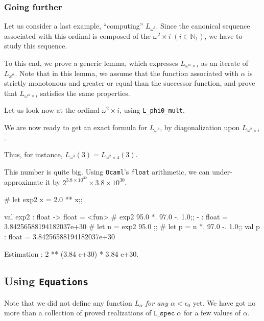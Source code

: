 \subsubsection{Going further}
Let us consider a last example, ``computing'' $L_{\omega^3}$.
Since the canonical sequence associated with this ordinal is composed of the
$\omega^2\times i\;(i\in\mathbb{N}_1)$, we have to study this sequence.

To this end, we prove a generic lemma, which expresses $L_{\omega^\alpha\times i}$ as an iterate of $L_{\omega^\alpha}$. Note that in this lemma, we assume that the function associated with $\alpha$ is strictly monotonous and
greater or equal than the successor function, and prove that $L_{\omega^\alpha\times i}$ satisfies  the same properties.



Let us look now
at the ordinal $\omega^2\times i$, using \texttt{L\_phi0\_mult}.




We are now ready to get an exact formula for $L_{\omega^3}$, by diagonalization upon $L_{\omega^2\times i}$.




Thus, for instance, $L_{\omega^3}(3)=L_{\omega^2\times 4}(3)$.




This number is quite big. Using \texttt{Ocaml}'s \texttt{float} arithmetic,
we can under-approximate it by $2^{3.8\times10^{30}}\times 3.8\times{10^{30}}$.

\begin{Coqsrc}
# let exp2 x = 2.0 ** x;;

val exp2 : float -> float = <fun>
#   exp2 95.0 *. 97.0 -. 1.0;;
- : float = 3.84256588194182037e+30
# let n = exp2 95.0 ;;
# let p = n *. 97.0 -. 1.0;;
val p : float = 3.84256588194182037e+30

Estimation :
2 ** (3.84 e+30) * 3.84 e+30.
\end{Coqsrc}


\subsection{Using \texttt{Equations}}
\label{sect:L-equations}

Note that we did not define any function $L_\alpha$ \emph{for any $\alpha<\epsilon_0$} yet. We have got no more than a collection of proved realizations of $\texttt{L\_spec}\;\alpha$ for a few values of $\alpha$.

